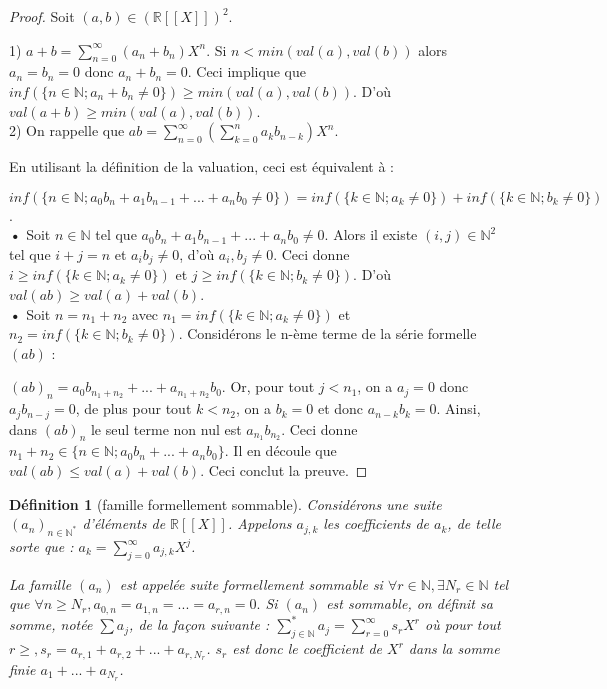 \documentclass[12pt,a4paper]{amsart}
\newtheorem{defn}[thm]{\bf D\'efinition}
\begin{document}
\begin{proof}
Soit $(a,b) \in (\mathbb{R}[[X]])^{2}$. 

1) $ a+ b =\sum_{n=0}^{\infty}(a_{n}+b_{n})X^{n}$. Si $n<min(val(a),val(b))$ alors $a_{n}=b_{n}=0$ donc $a_{n}+b_{n}=0$. Ceci implique que $inf(\{n\in \mathbb{N}; a_{n}+b_{n} \neq 0\}) \geq min(val(a), val(b))$. D'où $val(a+b) \geq min(val(a),val(b))$. \\

2) On rappelle que $ab=\sum_{n=0}^{\infty} \left(\sum_{k=0}^{n} a_{k}b_{n-k} \right)X^{n}$. 

En utilisant la définition de la valuation, ceci est équivalent à : 

$inf(\{n\in\mathbb{N}; a_{0}b_{n}+a_{1}b_{n-1}+...+a_{n}b_{0}\neq 0\})=inf(\{k\in\mathbb{N}; a_{k} \neq 0\})+inf(\{k\in\mathbb{N}; b_{k} \neq 0\})$. \\

\textbf{• } Soit $n\in \mathbb{N}$ tel que $a_{0}b_{n}+a_{1}b_{n-1}+...+a_{n}b_{0}\neq 0$. Alors il existe $(i,j)\in \mathbb{N}^{2}$ tel que $i+j=n$ et $a_{i}b_{j} \neq 0$, d'où $a_{i},b_{j}\neq 0$. Ceci donne $i \geq inf(\{k\in\mathbb{N}; a_{k} \neq 0\})$ et $j \geq inf(\{k\in\mathbb{N}; b_{k} \neq 0\})$. D'où $val(ab) \geq val(a)+val(b)$. \\

\textbf{• } Soit $n=n_{1}+ n_{2}$ avec $n_{1}= inf(\{k\in\mathbb{N}; a_{k} \neq 0\})$ et $n_{2}=inf(\{k\in\mathbb{N}; b_{k} \neq 0\})$. Considérons le n-ème terme de la série formelle $(ab) $ : 

$(ab)_{n}= a_{0}b_{n_{1}+n_{2}}+ ...+ a_{n_{1}+n_{2}}b_{0}$. Or, pour tout $j<n_{1}$, on a $a_{j}=0$ donc $a_{j}b_{n-j}=0$, de plus pour tout $k<n_{2}$, on a $b_{k}=0$ et donc $a_{n-k}b_{k}=0$. Ainsi, dans $(ab)_{n}$ le seul terme non nul est $a_{n_{1}}b_{n_{2}}$. Ceci donne $n_{1}+n_{2} \in \{n\in \mathbb{N}; a_{0}b_{n}+...+a_{n}b_{0}\}$. Il en découle que $val(ab) \leq val(a) +val(b)$. Ceci conclut la preuve.  

\end{proof}

\begin{defn}[famille formellement sommable] 
Considérons une suite $(a_{n})_{n\in\mathbb{N}^{\ast}}$ d'éléments de $\mathbb{R}[[X]]$. Appelons $a_{j,k}$ les coefficients de $a_{k}$, de telle sorte que : $a_{k}=\sum_{j=0}^{\infty} a_{j,k}X^{j}$.

La famille $(a_{n})$ est appelée suite formellement sommable si $\forall r \in \mathbb{N}, \exists N_{r} \in \mathbb{N} $ tel que $\forall n \geq N_{r}, a_{0,n}=a_{1,n}=...=a_{r,n}=0.$ Si $(a_{n})$ est sommable, on définit sa somme, notée $\sum a_{j}$, de la façon suivante : $\sum_{j\in \mathbb{N}}^{\ast} a_{j} = \sum_{r=0}^{\infty} s_{r}X^{r}$ où pour tout $r\geq , s_{r}=a_{r,1}+a_{r,2}+...+a_{r,N_{r}}$. $s_{r}$ est donc le coefficient de $X^{r}$ dans la somme finie $a_{1}+...+a_{N_{r}}$.
\end{defn}
\end{document}
